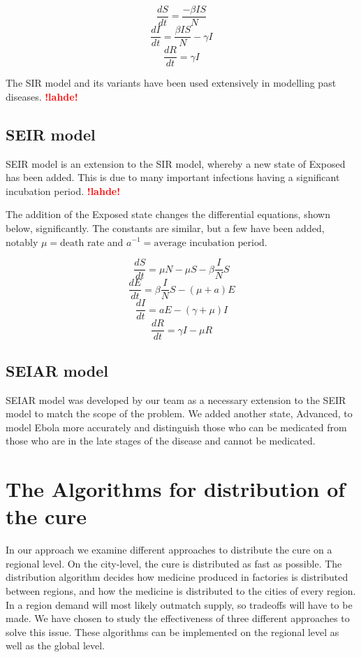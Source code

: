 \documentclass[12pt]{article}
\newcommand{\NB}[0]{\textcolor{red}{\textbf{!lahde!}}}
\begin{document}
$$\frac{dS}{dt} = \frac{-\beta I S}{N}$$
$$\frac{dI}{dt} = \frac{\beta I S}{N} - \gamma I$$
$$\frac{dR}{dt} = \gamma I$$

The SIR model and its variants have been used extensively in modelling past diseases. \NB

\subsection{SEIR model}

SEIR model is an extension to the SIR model, whereby a new state of Exposed has been added. This is due to many important infections having a significant incubation period. \NB

The addition of the Exposed state changes the differential equations, shown below, significantly. The constants are similar, but a few have been added, notably $\mu = \text{death rate}$ and $a^{-1} = \text{average incubation period}$.

$$\frac{dS}{dt} = \mu N - \mu S - \beta \frac{I}{N} S$$
$$\frac{dE}{dt} = \beta \frac{I}{N} S - (\mu + a) E$$
$$\frac{dI}{dt} = a E - (\gamma +\mu ) I$$
$$\frac{dR}{dt} = \gamma I  - \mu R$$

\subsection{SEIAR model}

SEIAR model was developed by our team as a necessary extension to the SEIR model to match the scope of the problem. We added another state, Advanced, to model Ebola more accurately and distinguish those who can be medicated from those who are in the late stages of the disease and cannot be medicated.

\newpage

\section{The Algorithms for distribution of the cure}

In our approach we examine different approaches to distribute the cure on a regional level. On the city-level, the cure is distributed as fast as possible. The distribution algorithm decides how medicine produced in factories is distributed between regions, and how the medicine is distributed to the cities of every region. In a region demand will most likely outmatch supply, so tradeoffs will have to be made. We have chosen to study the effectiveness of three different approaches to solve this issue. These algorithms can be implemented on the regional level as well as the global level. 
\end{document}
